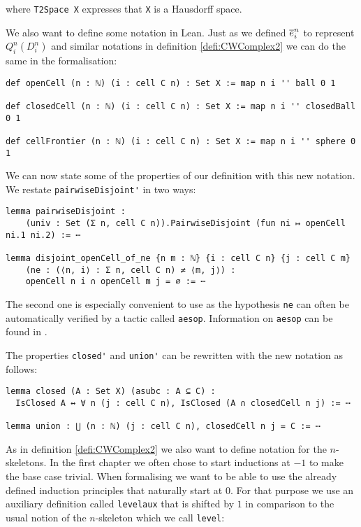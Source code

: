 where \lstinline{T2Space X} expresses that \lstinline{X} is a Hausdorff space.

We also want to define some notation in Lean. 
Just as we defined $\closedCell{n}{i}$ to represent $Q^n_i(D_i^n)$ and similar notations in definition \ref{defi:CWComplex2} we can do the same in the formalisation: 

\begin{lstlisting}
def openCell (n : ℕ) (i : cell C n) : Set X := map n i '' ball 0 1

def closedCell (n : ℕ) (i : cell C n) : Set X := map n i '' closedBall 0 1

def cellFrontier (n : ℕ) (i : cell C n) : Set X := map n i '' sphere 0 1
\end{lstlisting}

We can now state some of the properties of our definition with this new notation. 
We restate \lstinline{pairwiseDisjoint'} in two ways:

\begin{lstlisting}
lemma pairwiseDisjoint :
    (univ : Set (Σ n, cell C n)).PairwiseDisjoint (fun ni ↦ openCell ni.1 ni.2) := ⋯

lemma disjoint_openCell_of_ne {n m : ℕ} {i : cell C n} {j : cell C m}
    (ne : (⟨n, i⟩ : Σ n, cell C n) ≠ ⟨m, j⟩) : 
    openCell n i ∩ openCell m j = ∅ := ⋯
\end{lstlisting}

The second one is especially convenient to use as the hypothesis \lstinline{ne} can often be automatically verified by a tactic called \lstinline{aesop}. 
Information on \lstinline{aesop} can be found in \cite{Limperg2023}. 

The properties \lstinline{closed'} and \lstinline{union'} can be rewritten with the new notation as follows: 

\begin{lstlisting}
lemma closed (A : Set X) (asubc : A ⊆ C) :
  IsClosed A ↔ ∀ n (j : cell C n), IsClosed (A ∩ closedCell n j) := ⋯

lemma union : ⋃ (n : ℕ) (j : cell C n), closedCell n j = C := ⋯
\end{lstlisting}

As in definition \ref{defi:CWComplex2} we also want to define notation for the $n$-skeletons. 
In the first chapter we often chose to start inductions at $-1$ to make the base case trivial. 
When formalising we want to be able to use the already defined induction principles that naturally start at $0$.
For that purpose we use an auxiliary definition called \lstinline{levelaux} that is shifted by $1$ in comparison to the usual notion of the $n$-skeleton which we call \lstinline{level}: 

